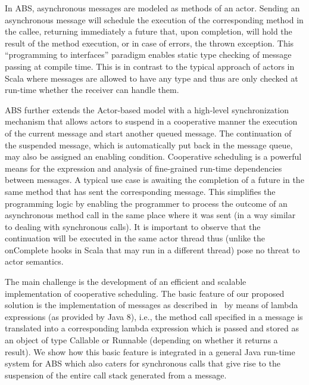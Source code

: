 \par In ABS, asynchronous messages are modeled as methods of an actor.
Sending an asynchronous message will schedule the execution of the corresponding method in the callee, returning immediately a future that, upon completion, will hold the result of the method execution, or in case of errors, the thrown exception.
This ``programming to interfaces'' paradigm enables static type checking of message passing at compile time.
This is in contrast to the typical approach of actors in Scala where messages are allowed to have any type and thus are only checked at run-time whether the receiver can handle them.

ABS further extends the Actor-based model with a high-level synchronization mechanism that allows actors to suspend in a cooperative manner the execution of the current message and start another queued message. 
The continuation of the suspended message, which is automatically put back in the message queue, may also be assigned an enabling condition. Cooperative scheduling is a powerful means for the expression and analysis of fine-grained run-time dependencies between messages.
A typical use case is awaiting the completion of a future in the same method that has sent the corresponding message.
This simplifies the programming logic by enabling the programmer to process the outcome of an asynchronous method call in the same place where it was sent (in a way similar to dealing with synchronous calls).
It is important to observe that the continuation will be executed in the same actor thread thus (unlike the {\ttfamily onComplete} hooks in Scala that may run in a different thread) pose no threat to actor semantics.

The main challenge is the development of an efficient and scalable implementation of cooperative scheduling. 
The basic feature of our proposed solution is the implementation of messages as described in~\cite{paj8} by means of lambda expressions (as provided by Java 8), i.e., the method call specified in a message
is translated into a corresponding lambda expression which is passed and stored as
an object of type Callable or Runnable (depending on whether it returns a result). We show how this basic feature is integrated in a general Java run-time system for ABS which also caters for synchronous calls that give rise to the suspension of the entire call stack generated from a message.

